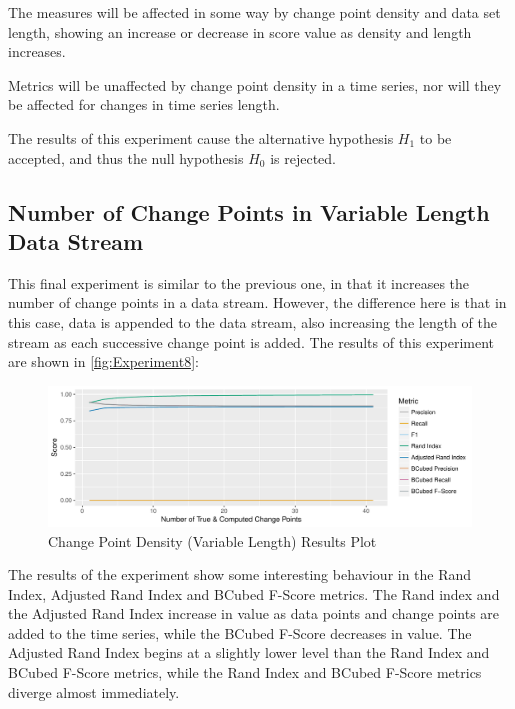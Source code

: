 \documentclass[../main.tex]{subfiles}
\begin{document}
\begin{hypothesis*}
    The measures will be affected in some way by change point density and data set length, showing an increase or decrease in score value as density and length increases.
\end{hypothesis*}

\begin{nullhypothesis*}
    Metrics will be unaffected by change point density in a time series, nor will they be affected for changes in time series length.
\end{nullhypothesis*}

The results of this experiment cause the alternative hypothesis $H_1$ to be accepted, and thus the null hypothesis $H_0$ is rejected.

\subsection{Number of Change Points in Variable Length Data Stream}

This final experiment is similar to the previous one, in that it increases the number of change points in a data stream. However, the difference here is that in this case, data is appended to the data stream, also increasing the length of the stream as each successive change point is added. The results of this experiment are shown in \autoref{fig:Experiment8}:

\begin{figure}[H]
    \includegraphics[width=\textwidth]{figures/Experiment7}
    \caption{Change Point Density (Variable Length) Results Plot}
    \label{fig:Experiment8}
\end{figure}

The results of the experiment show some interesting behaviour in the Rand Index, Adjusted Rand Index and BCubed F-Score metrics. The Rand index and the Adjusted Rand Index increase in value as data points and change points are added to the time series, while the BCubed F-Score decreases in value. The Adjusted Rand Index begins at a slightly lower level than the Rand Index and BCubed F-Score metrics, while the Rand Index and BCubed F-Score metrics diverge almost immediately.
\end{document}
